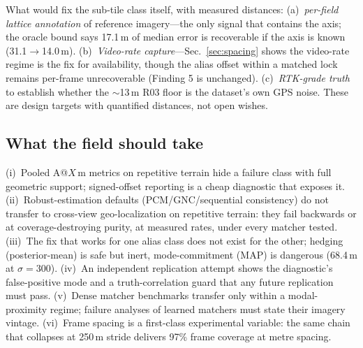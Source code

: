 \documentclass[journal]{IEEEtran}
\begin{document}
What would fix the sub-tile class itself, with measured distances: (a)~\emph{per-field lattice annotation} of reference imagery---the only signal that contains the axis; the oracle bound says 17.1\,m of median error is recoverable if the axis is known (31.1$\to$14.0\,m). (b)~\emph{Video-rate capture}---Sec.~\ref{sec:spacing} shows the video-rate regime is the fix for availability, though the alias offset within a matched lock remains per-frame unrecoverable (Finding 5 is unchanged). (c)~\emph{RTK-grade truth} to establish whether the $\sim$13\,m R03 floor is the dataset's own GPS noise. These are design targets with quantified distances, not open wishes.

\subsection{What the field should take}
(i)~Pooled A@$X$\,m metrics on repetitive terrain hide a failure class with full geometric support; signed-offset reporting is a cheap diagnostic that exposes it. (ii)~Robust-estimation defaults (PCM/GNC/sequential consistency) do not transfer to cross-view geo-localization on repetitive terrain: they fail backwards or at coverage-destroying purity, at measured rates, under every matcher tested. (iii)~The fix that works for one alias class does not exist for the other; hedging (posterior-mean) is safe but inert, mode-commitment (MAP) is dangerous (68.4\,m at $\sigma=300$). (iv)~An independent replication attempt shows the diagnostic's false-positive mode and a truth-correlation guard that any future replication must pass. (v)~Dense matcher benchmarks transfer only within a modal-proximity regime; failure analyses of learned matchers must state their imagery vintage. (vi)~Frame spacing is a first-class experimental variable: the same chain that collapses at 250\,m stride delivers 97\% frame coverage at metre spacing.
\end{document}
